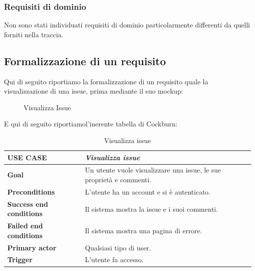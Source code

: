 \documentclass[a4paper, 11pt]{article}
\begin{document}
\subsubsection{Requisiti di dominio}
    Non sono stati individuati requisiti di dominio particolarmente differenti da quelli forniti nella traccia.

\newpage
\subsection{Formalizzazione di un requisito}
Qui di seguito riportiamo la formalizzazione di un requisito quale la visualizzazione di una issue, prima mediante il suo mockup: 

\begin{figure}[H]
    \centering
    
    \caption{Visualizza Issue}
    \label{fig:visualizza_issue_mockup}
\end{figure}

\newpage
E qui di seguito riportiamol'inerente tabella di Cockburn:


\begin{table}[H]
\centering
\begin{tabularx}{\linewidth}{|l|>{\raggedright\arraybackslash}X|}
\hline
\large\textbf{USE CASE} & \large\textit{Visualizza issue} \\
\hline
\textbf{Goal} & Un utente vuole visualizzare una issue, le sue proprietà e commenti. \\
\hline
\textbf{Preconditions} & L'utente ha un account e si è autenticato. \\
\hline
\textbf{Success end conditions} & Il sistema mostra la issue e i suoi commenti. \\
\hline
\textbf{Failed end conditions} & Il sistema mostra una pagina di errore. \\
\hline
\textbf{Primary actor} & Qualsiasi tipo di user. \\
\hline
\textbf{Trigger} & L’utente fa accesso. \\
\hline
\end{tabularx}
\caption{Visualizza issue}
\label{tab:visualizza_issue}
\end{table}
\end{document}
